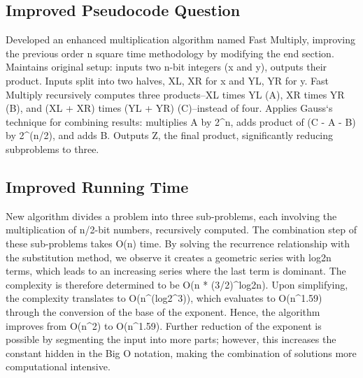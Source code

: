 \subsection*{Improved  Pseudocode Question}
Developed an enhanced multiplication algorithm named Fast Multiply, improving the previous order n square time methodology by modifying the end section.
Maintains original setup: inputs two n-bit integers (x and y), outputs their product.
Inputs split into two halves, XL, XR for x and YL, YR for y.
Fast Multiply recursively computes three products--XL times YL (A), XR times YR (B), and (XL + XR) times (YL + YR) (C)--instead of four.
Applies Gauss`s technique for combining results: multiplies A by 2\textasciicircum{}n, adds product of (C - A - B) by 2\textasciicircum{}(n/2), and adds B\@.
Outputs Z, the final product, significantly reducing subproblems to three.

\subsection*{Improved  Running Time}
New algorithm divides a problem into three sub-problems, each involving the multiplication of n/2-bit numbers, recursively computed.
The combination step of these sub-problems takes O(n) time.
By solving the recurrence relationship with the substitution method, we observe it creates a geometric series with log2n terms, which leads to an increasing series where the last term is dominant.
The complexity is therefore determined to be O(n * (3/2)\textasciicircum{}log2n).
Upon simplifying, the complexity translates to O(n\textasciicircum{}(log2\textasciicircum{}3)), which evaluates to O(n\textasciicircum{}1.59) through the conversion of the base of the exponent.
Hence, the algorithm improves from O(n\textasciicircum{}2) to O(n\textasciicircum{}1.59).
Further reduction of the exponent is possible by segmenting the input into more parts; however, this increases the constant hidden in the Big O notation, making the combination of solutions more computational intensive.

